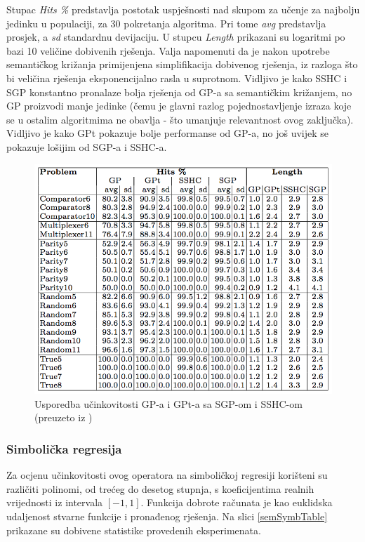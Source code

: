Stupac \textit{Hits \%} predstavlja postotak uspješnosti nad skupom za učenje za najbolju jedinku u populaciji, za 30 pokretanja algoritma. Pri tome \textit{avg} predstavlja prosjek, a \textit{sd} standardnu devijaciju. U stupcu \textit{Length} prikazani su logaritmi po bazi 10 veličine dobivenih rješenja. Valja napomenuti da je nakon upotrebe semantičkog križanja primijenjena simplifikacija dobivenog rješenja, iz razloga što bi veličina rješenja eksponencijalno rasla u suprotnom. Vidljivo je kako SSHC i SGP konstantno pronalaze bolja rješenja od GP-a sa semantičkim križanjem, no GP proizvodi manje jedinke (čemu je glavni razlog pojednostavljenje izraza koje se u ostalim algoritmima ne obavlja - što umanjuje relevantnost ovog zaključka).  Vidljivo je kako GPt pokazuje bolje performanse od GP-a, no još uvijek se pokazuje lošijim od SGP-a i SSHC-a.

 \begin{figure}[H]
	\centering
	\includegraphics[scale=0.5]{./slike/semBoolTable.png}
	\caption{Usporedba učinkovitosti GP-a i GPt-a sa SGP-om i SSHC-om (preuzeto iz \cite{crxSem})}
	\label{semBoolTable}
\end{figure}

\subsubsection{Simbolička regresija}

Za ocjenu učinkovitosti ovog operatora na simboličkoj regresiji korišteni su različiti polinomi, od trećeg do desetog stupnja, s koeficijentima realnih vrijednosti iz intervala $[-1, 1]$. Funkcija dobrote računata je kao euklidska udaljenost stvarne funkcije i pronađenog rješenja. Na slici \ref{semSymbTable} prikazane su dobivene statistike provedenih eksperimenata.

